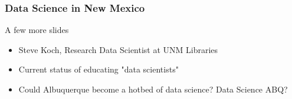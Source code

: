 
\begin{frame}
\frametitle{Data Science in New Mexico}
\begin{center}

\begin{block}{A few more slides}
\begin{itemize}
    \item Steve Koch, Research Data Scientist at UNM Libraries
	\item Current status of educating "data scientists"
	\item Could Albuquerque become a hotbed of data science? Data Science ABQ? 
\end{itemize}
\end{block}


\end{center}
\end{frame}


